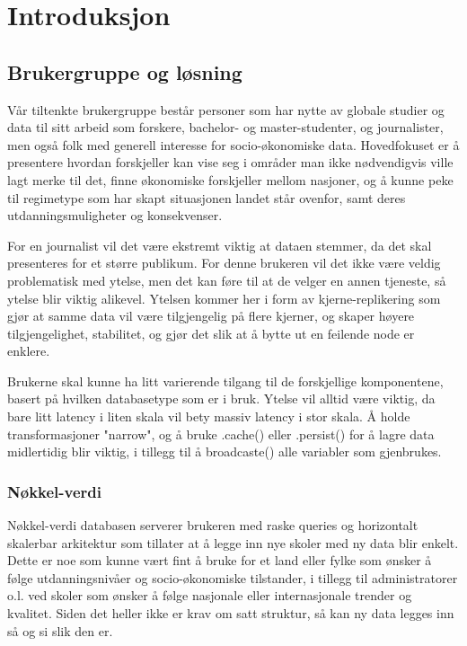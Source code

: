 \section{Introduksjon}

\subsection{Brukergruppe og løsning}
Vår tiltenkte brukergruppe består personer som har nytte av globale studier og data til sitt arbeid som forskere, bachelor- og master-studenter, og journalister, men også folk med generell interesse for socio-økonomiske data. Hovedfokuset er å presentere hvordan forskjeller kan vise seg i områder man ikke nødvendigvis ville lagt merke til det, finne økonomiske forskjeller mellom nasjoner, og å kunne peke til regimetype som har skapt situasjonen landet står ovenfor, samt deres utdanningsmuligheter og konsekvenser.

For en journalist vil det være ekstremt viktig at dataen stemmer, da det skal presenteres for et større publikum. For denne brukeren vil det ikke være veldig problematisk med ytelse, men det kan føre til at de velger en annen tjeneste, så ytelse blir viktig alikevel. Ytelsen kommer her i form av kjerne-replikering som gjør at samme data vil være tilgjengelig på flere kjerner, og skaper høyere tilgjengelighet, stabilitet, og gjør det slik at å bytte ut en feilende node er enklere.

Brukerne skal kunne ha litt varierende tilgang til de forskjellige komponentene, basert på hvilken databasetype som er i bruk. Ytelse vil alltid være viktig, da bare litt latency i liten skala vil bety massiv latency i stor skala. Å holde transformasjoner "narrow", og å bruke .cache() eller .persist() for å lagre data midlertidig blir viktig, i tillegg til å broadcaste() alle variabler som gjenbrukes.

\subsubsection{Nøkkel-verdi}
Nøkkel-verdi databasen serverer brukeren med raske queries og horizontalt skalerbar arkitektur som tillater at å legge inn nye skoler med ny data blir enkelt. Dette er noe som kunne vært fint å bruke for et land eller fylke som ønsker å følge utdanningsnivåer og socio-økonomiske tilstander, i tillegg til administratorer o.l. ved skoler som ønsker å følge nasjonale eller internasjonale trender og kvalitet. Siden det heller ikke er krav om satt struktur, så kan ny data legges inn så og si slik den er.

